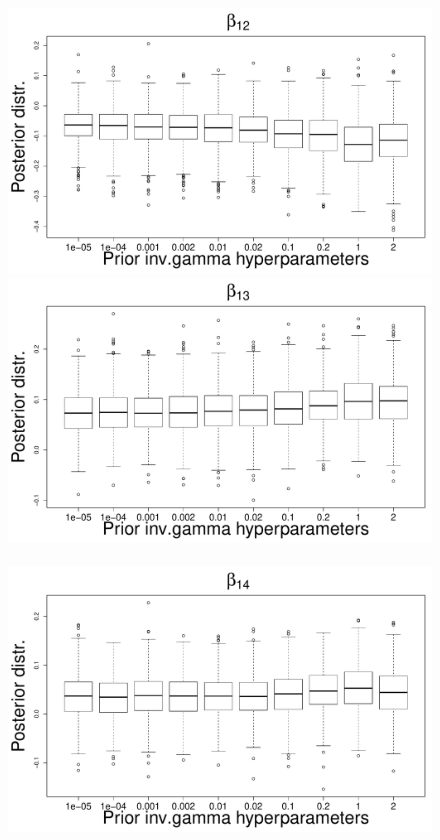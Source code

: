 \documentclass{statsoc}
\numberwithin{figure}{section}
\numberwithin{table}{section}
\begin{document}
\begin{figure}
\includegraphics[scale=0.25]{Sensitivity/beta_12_sensitivity.pdf}\\
\includegraphics[scale=0.25]{Sensitivity/beta_13_sensitivity.pdf}~
\includegraphics[scale=0.25]{Sensitivity/beta_14_sensitivity.pdf}\\

\end{figure}
\end{document}
